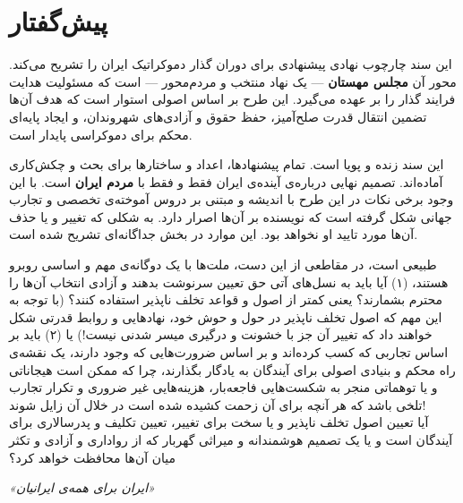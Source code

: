 \frontmatter
\pagestyle{plain}

\chapter*{پیش‌گفتار}
\begin{summarybox}
	این سند چارچوب نهادی پیشنهادی برای دوران گذار دموکراتیک ایران را تشریح
	می‌کند. محور آن \textbf{مجلس مهستان} — یک نهاد منتخب و مردم‌محور — است که مسئولیت
	هدایت فرایند گذار را بر عهده می‌گیرد. این طرح بر اساس اصولی استوار است که هدف آن‌ها تضمین انتقال قدرت صلح‌آمیز، حفظ حقوق و آزادی‌های شهروندان، و ایجاد پایه‌ای محکم برای دموکراسی پایدار است.
	
	این سند زنده و پویا است. تمام پیشنهادها، اعداد و ساختارها برای بحث و چکش‌کاری آماده‌اند.
	تصمیم نهایی درباره‌ی آینده‌ی ایران فقط و فقط با \textbf{مردم ایران} است. با این وجود برخی نکات در این طرح با اندیشه و مبتنی بر دروس آموخته‌ی تخصصی و تجارب جهانی شکل گرفته است که نویسنده بر آن‌ها اصرار دارد. به شکلی که تغییر و یا حذف آن‌ها مورد تایید او نخواهد بود. این موارد در بخش جداگانه‌ای تشریح شده است. 

    طبیعی است، در مقاطعی از این دست، ملت‌ها با یک دوگانه‌ی مهم و اساسی روبرو هستند، (۱) آیا باید به نسل‌های آتی حق تعیین سرنوشت بدهند و آزادی انتخاب آن‌ها را محترم بشمارند؟ یعنی کمتر از اصول و قواعد تخلف ناپذیر استفاده کنند؟ (با توجه به این مهم که اصول تخلف ناپذیر در حول و حوش خود، نهادهایی و روابط قدرتی شکل خواهند داد که تغییر آن جز با خشونت و درگیری میسر شدنی نیست!) یا (۲) باید بر اساس تجاربی که کسب کرده‌اند و بر اساس ضرورت‌هایی که وجود دارند، یک نقشه‌ی راه محکم و بنیادی اصولی برای آیندگان به یادگار بگذارند، چرا که ممکن است هیجاناتی و یا توهماتی منجر به شکست‌هایی فاجعه‌بار، هزینه‌هایی غیر ضروری و تکرار تجارب تلخی باشد که هر آنچه برای آن زحمت کشیده شده است در خلال آن زایل شوند! 
    \\آیا تعیین اصول تخلف ناپذیر و یا سخت برای تغییر، تعیین تکلیف و پدرسالاری برای آیندگان است و یا یک تصمیم هوشمندانه و میراثی گهربار که از رواداری و آزادی و تکثر میان آن‌ها محافظت خواهد کرد؟ 

\end{summarybox}

\vspace{1cm}
\begin{center}
	{\large\color{MahestanDarkBlue}\itshape
		«ایران برای همه‌ی ایرانیان»}
\end{center}

